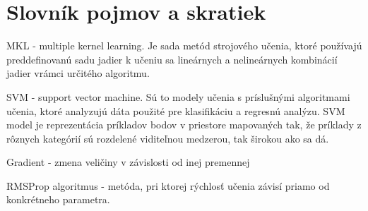 \newpage
\thispagestyle{plain}
\section* {Slovník pojmov a skratiek}

MKL - multiple kernel learning. Je sada metód strojového učenia, ktoré používajú preddefinovanú sadu jadier k učeniu sa lineárnych a nelineárnych kombinácií jadier vrámci určitého algoritmu.\cite{MKL}

SVM\label{svm_dict} - support vector machine. Sú to modely učenia s príslušnými algoritmami učenia, ktoré analyzujú dáta použité pre klasifikáciu a regresnú analýzu. SVM model je reprezentácia príkladov bodov v priestore mapovaných tak, že príklady z rôznych kategórií sú rozdelené viditeľnou medzerou, tak širokou ako sa dá.\cite{SVM}

Gradient\label{gradient} - zmena veličiny v závislosti od inej premennej

RMSProp algoritmus\label{RMS} - metóda, pri ktorej rýchlosť učenia závisí priamo od konkrétneho parametra.\cite{rms}